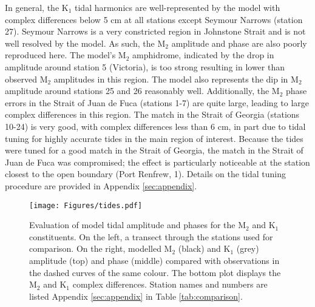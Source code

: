 \documentclass[letterpaper]{tATO2e}
\begin{document}
In general, the K$_1$ tidal harmonics are well-represented by the model with complex differences below 5 cm at all stations except Seymour Narrows (station 27). Seymour Narrows is a very constricted region in Johnstone Strait and is not well resolved by the model. As such, the M$_2$ amplitude and phase are also poorly reproduced here.  The model's M$_2$ amphidrome, indicated by the drop in amplitude around station 5 (Victoria), is too strong resulting in lower than observed M$_2$ amplitudes in this region. {\color{red} The model also represents the dip in M$_2$ amplitude around stations 25 and 26 reasonably well.} Additionally, the M$_2$ phase errors in the Strait of Juan de Fuca (stations 1-7) are quite large, leading to large complex differences in this region.  The match in the Strait of Georgia (stations 10-24) is very good, with complex differences less than 6 cm, in part due to tidal tuning for highly accurate tides in the main region of interest.  {\color{red}Because the tides were tuned for a good match in the Strait of Georgia, the match in the Strait of Juan de Fuca was compromised; the effect is particularly noticeable at the station closest to the open boundary (Port Renfrew, 1). } Details on the tidal tuning procedure are provided in Appendix \ref{sec:appendix}.


\begin{figure}
\centering
\texttt{[image: Figures/tides.pdf]}
\caption{Evaluation of model tidal amplitude and phases for the M$_2$ and K$_1$ constituents. On the left, a transect through the stations used for comparison. On the right, modelled M$_2$ (black) and K$_1$ (grey) amplitude (top) and phase (middle) compared with observations in the dashed curves of the same colour. The bottom plot displays the M$_2$ and K$_1$ complex differences. Station names and numbers are listed Appendix \ref{sec:appendix} in Table \ref{tab:comparison}.}
\label{fig:tides}
\end{figure}
\end{document}
